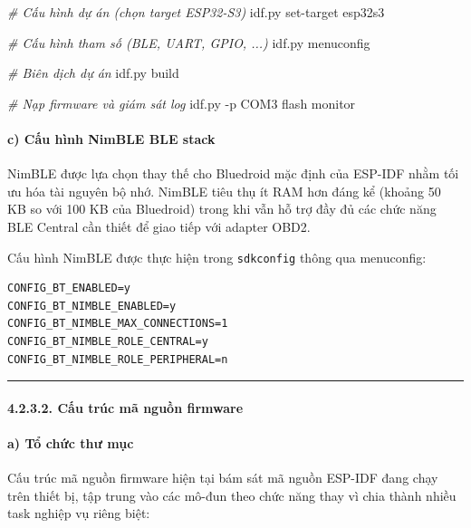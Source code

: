 \documentclass[13pt,a4paper]{extarticle}
\newenvironment{Shaded}{}{}
\newcommand{\AttributeTok}[1]{\textcolor[rgb]{0.49,0.56,0.16}{#1}}
\newcommand{\CommentTok}[1]{\textcolor[rgb]{0.38,0.63,0.69}{\textit{#1}}}
\newcommand{\ExtensionTok}[1]{#1}
\newcommand{\NormalTok}[1]{#1}
\renewcommand{\\}{\thesislongtableorignewline\hline}%
\begin{document}
\begin{Shaded}
\begin{Highlighting}[]
\CommentTok{\# Cấu hình dự án (chọn target ESP32{-}S3)}
\ExtensionTok{idf.py}\NormalTok{ set{-}target esp32s3}

\CommentTok{\# Cấu hình tham số (BLE, UART, GPIO, ...)}
\ExtensionTok{idf.py}\NormalTok{ menuconfig}

\CommentTok{\# Biên dịch dự án}
\ExtensionTok{idf.py}\NormalTok{ build}

\CommentTok{\# Nạp firmware và giám sát log}
\ExtensionTok{idf.py} \AttributeTok{{-}p}\NormalTok{ COM3 flash monitor}
\end{Highlighting}
\end{Shaded}

\paragraph{c) Cấu hình NimBLE BLE
stack}\label{c-cux1ea5u-huxecnh-nimble-ble-stack}

NimBLE được lựa chọn thay thế cho Bluedroid mặc định của ESP-IDF nhằm
tối ưu hóa tài nguyên bộ nhớ. NimBLE tiêu thụ ít RAM hơn đáng kể (khoảng
50 KB so với 100 KB của Bluedroid) trong khi vẫn hỗ trợ đầy đủ các chức
năng BLE Central cần thiết để giao tiếp với adapter OBD2.

Cấu hình NimBLE được thực hiện trong \texttt{sdkconfig} thông qua
menuconfig:

\begin{verbatim}
CONFIG_BT_ENABLED=y
CONFIG_BT_NIMBLE_ENABLED=y
CONFIG_BT_NIMBLE_MAX_CONNECTIONS=1
CONFIG_BT_NIMBLE_ROLE_CENTRAL=y
CONFIG_BT_NIMBLE_ROLE_PERIPHERAL=n
\end{verbatim}

\begin{center}\rule{0.5\linewidth}{0.5pt}\end{center}

\paragraph{4.2.3.2. Cấu trúc mã nguồn
firmware}\label{4232-cux1ea5u-truxfac-muxe3-nguux1ed3n-firmware}

\paragraph{a) Tổ chức thư
mục}\label{a-tux1ed5-chux1ee9c-thux1b0-mux1ee5c}

Cấu trúc mã nguồn firmware hiện tại bám sát mã nguồn ESP-IDF đang chạy
trên thiết bị, tập trung vào các mô-đun theo chức năng thay vì chia
thành nhiều task nghiệp vụ riêng biệt:
\end{document}
